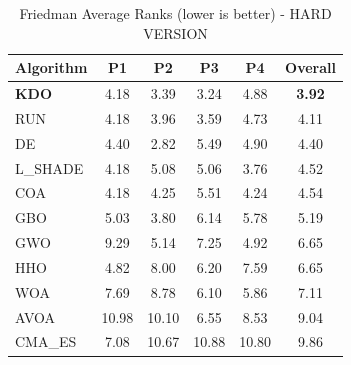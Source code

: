 \begin{table}[htbp]
\centering
\caption{Friedman Average Ranks (lower is better) - HARD VERSION}
\label{tab:friedman_ranks}
\small
\begin{tabular}{lccccc}
\toprule
\textbf{Algorithm} & \textbf{P1} & \textbf{P2} & \textbf{P3} & \textbf{P4} & \textbf{Overall} \\
\midrule
\textbf{KDO} & 4.18 & 3.39 & 3.24 & 4.88 & \textbf{3.92} \\
RUN & 4.18 & 3.96 & 3.59 & 4.73 & 4.11 \\
DE & 4.40 & 2.82 & 5.49 & 4.90 & 4.40 \\
L_SHADE & 4.18 & 5.08 & 5.06 & 3.76 & 4.52 \\
COA & 4.18 & 4.25 & 5.51 & 4.24 & 4.54 \\
GBO & 5.03 & 3.80 & 6.14 & 5.78 & 5.19 \\
GWO & 9.29 & 5.14 & 7.25 & 4.92 & 6.65 \\
HHO & 4.82 & 8.00 & 6.20 & 7.59 & 6.65 \\
WOA & 7.69 & 8.78 & 6.10 & 5.86 & 7.11 \\
AVOA & 10.98 & 10.10 & 6.55 & 8.53 & 9.04 \\
CMA_ES & 7.08 & 10.67 & 10.88 & 10.80 & 9.86 \\
\bottomrule
\end{tabular}
\end{table}
